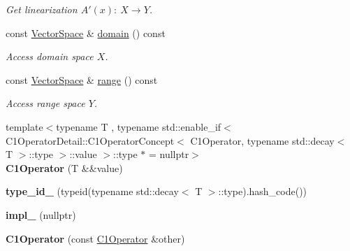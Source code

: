 \begin{DoxyCompactItemize}
\begin{DoxyCompactList}\small\item\em \-Get linearization $A'(x):\ X\to Y $. \end{DoxyCompactList}\item 
\hypertarget{classSpacy_1_1C1Operator_aee0ffd5cee0b8a8df2f0b67b5aaf0ddb}{const \hyperlink{classSpacy_1_1VectorSpace}{\-Vector\-Space} \& \hyperlink{classSpacy_1_1C1Operator_aee0ffd5cee0b8a8df2f0b67b5aaf0ddb}{domain} () const }\label{classSpacy_1_1C1Operator_aee0ffd5cee0b8a8df2f0b67b5aaf0ddb}

\begin{DoxyCompactList}\small\item\em \-Access domain space $X$. \end{DoxyCompactList}\item 
\hypertarget{classSpacy_1_1C1Operator_a7df27427591907b13776e7ba3707bf05}{const \hyperlink{classSpacy_1_1VectorSpace}{\-Vector\-Space} \& \hyperlink{classSpacy_1_1C1Operator_a7df27427591907b13776e7ba3707bf05}{range} () const }\label{classSpacy_1_1C1Operator_a7df27427591907b13776e7ba3707bf05}

\begin{DoxyCompactList}\small\item\em \-Access range space $Y$. \end{DoxyCompactList}\item 
\hypertarget{classSpacy_1_1C1Operator_a9a46e9d2fb4526fa320480b832c5b71e}{{\footnotesize template$<$typename T , typename std\-::enable\-\_\-if$<$ C1\-Operator\-Detail\-::\-C1\-Operator\-Concept$<$ C1\-Operator, typename std\-::decay$<$ T $>$\-::type $>$\-::value $>$\-::type $\ast$  = nullptr$>$ }\\{\bfseries \-C1\-Operator} (\-T \&\&value)}\label{classSpacy_1_1C1Operator_a9a46e9d2fb4526fa320480b832c5b71e}

\item 
\hypertarget{classSpacy_1_1C1Operator_a54abfdab254b7783053962eaa7441bd0}{{\bfseries type\-\_\-id\-\_\-} (typeid(typename std\-::decay$<$ \-T $>$\-::type).hash\-\_\-code())}\label{classSpacy_1_1C1Operator_a54abfdab254b7783053962eaa7441bd0}

\item 
\hypertarget{classSpacy_1_1C1Operator_a4702285eff4b4153117a70a39c1c6f99}{{\bfseries impl\-\_\-} (nullptr)}\label{classSpacy_1_1C1Operator_a4702285eff4b4153117a70a39c1c6f99}

\item 
\hypertarget{classSpacy_1_1C1Operator_a5524db9b344fbab2f183f7b509fb7f26}{{\bfseries \-C1\-Operator} (const \hyperlink{classSpacy_1_1C1Operator}{\-C1\-Operator} \&other)}\label{classSpacy_1_1C1Operator_a5524db9b344fbab2f183f7b509fb7f26}


\end{DoxyCompactItemize}
